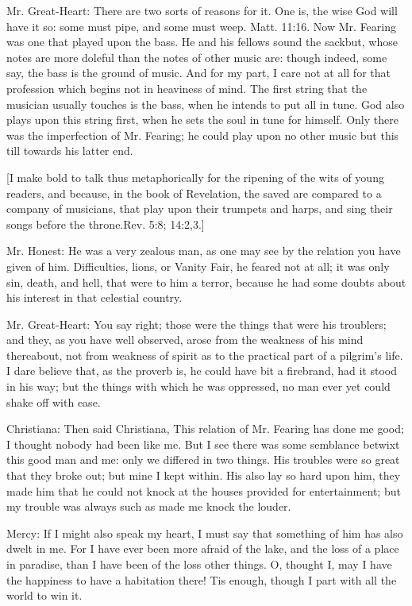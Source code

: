 Mr. Great-Heart: There are two sorts of reasons for it. One is, the wise God will have it so: some must pipe, and some must weep. Matt. 11:16. Now Mr. Fearing was one that played upon the bass. He and his fellows sound the sackbut, whose notes are more doleful than the notes of other music are: though indeed, some say, the bass is the ground of music. And for my part, I care not at all for that profession which begins not in heaviness of mind. The first string that the musician usually touches is the bass, when he intends to put all in tune. God also plays upon this string first, when he sets the soul in tune for himself. Only there was the imperfection of Mr. Fearing; he could play upon no other music but this till towards his latter end.

[I make bold to talk thus metaphorically for the ripening of the wits of young readers, and because, in the book of Revelation, the saved are compared to a company of musicians, that play upon their trumpets and harps, and sing their songs before the throne.Rev. 5:8; 14:2,3.]

Mr. Honest: He was a very zealous man, as one may see by the relation you have given of him. Difficulties, lions, or Vanity Fair, he feared not at all; it was only sin, death, and hell, that were to him a terror, because he had some doubts about his interest in that celestial country.

Mr. Great-Heart: You say right; those were the things that were his troublers; and they, as you have well observed, arose from the weakness of his mind thereabout, not from weakness of spirit as to the practical part of a pilgrim's life. I dare believe that, as the proverb is, he could have bit a firebrand, had it stood in his way; but the things with which he was oppressed, no man ever yet could shake off with ease.

Christiana: Then said Christiana, This relation of Mr. Fearing has done me good; I thought nobody had been like me. But I see there was some semblance betwixt this good man and me: only we differed in two things. His troubles were so great that they broke out; but mine I kept within. His also lay so hard upon him, they made him that he could not knock at the houses provided for entertainment; but my trouble was always such as made me knock the louder.

Mercy: If I might also speak my heart, I must say that something of him has also dwelt in me. For I have ever been more afraid of the lake, and the loss of a place in paradise, than I have been of the loss other things. O, thought I, may I have the happiness to have a habitation there! Tis enough, though I part with all the world to win it.


